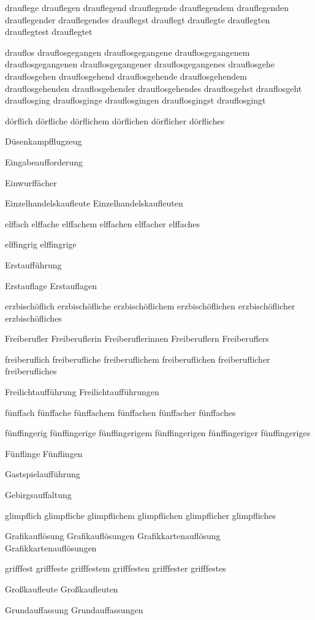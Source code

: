 drauflege drauflegen drauflegend drauflegende drauflegendem drauflegenden drauflegender drauflegendes drauflegst drauflegt drauflegte drauflegten drauflegtest drauflegtet

drauflos drauflosgegangen drauflosgegangene drauflosgegangenem drauflosgegangenen drauflosgegangener drauflosgegangenes drauflosgehe drauflosgehen drauflosgehend drauflosgehende drauflosgehendem drauflosgehenden drauflosgehender drauflosgehendes drauflosgehst drauflosgeht drauflosging drauflosginge drauflosgingen drauflosgingst drauflosgingt

dörflich dörfliche dörflichem dörflichen dörflicher dörfliches

Düsenkampfflugzeug

Eingabeaufforderung

Einwurffächer

Einzelhandelskaufleute Einzelhandelskaufleuten

elffach elffache elffachem elffachen elffacher elffaches

elffingrig elffingrige

Erstaufführung

Erstauflage
Erstauflagen

erzbischöflich erzbischöfliche erzbischöflichem erzbischöflichen erzbischöflicher erzbischöfliches

Freiberufler Freiberuflerin Freiberuflerinnen Freiberuflern Freiberuflers

freiberuflich freiberufliche freiberuflichem freiberuflichen freiberuflicher freiberufliches

Freilichtaufführung Freilichtaufführungen

fünffach fünffache fünffachem fünffachen fünffacher fünffaches

fünffingerig fünffingerige fünffingerigem fünffingerigen fünffingeriger fünffingeriges

Fünflinge Fünflingen

Gastspielaufführung

Gebirgsauffaltung

glimpflich glimpfliche glimpflichem glimpflichen glimpflicher glimpfliches

Grafikauflösung Grafikauflösungen Grafikkartenauflösung Grafikkartenauflösungen

grifffest grifffeste grifffestem grifffesten grifffester grifffestes

Großkaufleute Großkaufleuten %

Grundauffassung Grundauffassungen

